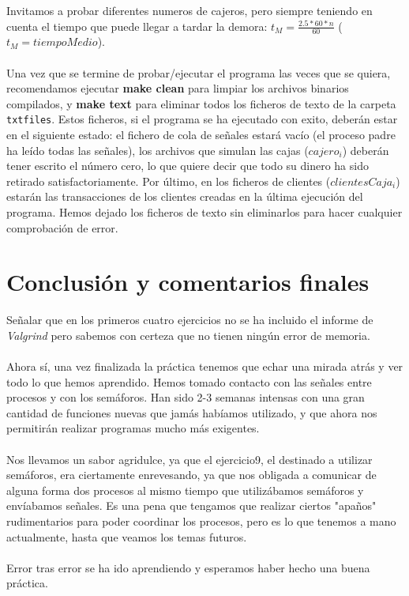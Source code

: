 \documentclass[12pt]{article}
\begin{document}
Invitamos a probar diferentes numeros de cajeros, pero siempre teniendo en cuenta el tiempo que puede llegar a tardar la demora: $t_{M} = \frac{2.5*60*n}{60}$ ($t_{M} = tiempoMedio$).\\\\
Una vez que se termine de probar/ejecutar el programa las veces que se quiera, recomendamos ejecutar \textbf{make clean} para limpiar los archivos binarios compilados, y \textbf{make text} para eliminar todos los ficheros de texto de la carpeta \texttt{txtfiles}. Estos ficheros, si el programa se ha ejecutado con exito, deberán estar en el siguiente estado: el fichero de cola de señales estará vacío (el proceso padre ha leído todas las señales), los archivos que simulan las cajas ($cajero_i$) deberán tener escrito el número cero, lo que quiere decir que todo su dinero ha sido retirado satisfactoriamente. Por último, en los ficheros de clientes ($clientesCaja_i$) estarán las transacciones de los clientes creadas en la última ejecución del programa. Hemos dejado los ficheros de texto sin eliminarlos para hacer cualquier comprobación de error.

\section{Conclusión y comentarios finales}
Señalar que en los primeros cuatro ejercicios no se ha incluido el informe de \emph{Valgrind} pero sabemos con certeza que no tienen ningún error de memoria.\\\\
Ahora sí, una vez finalizada la práctica tenemos que echar una mirada atrás y ver todo lo que hemos aprendido. Hemos tomado contacto con las señales entre procesos y con los semáforos. Han sido 2-3 semanas intensas con una gran cantidad de funciones nuevas que jamás habíamos utilizado, y que ahora nos permitirán realizar programas mucho más exigentes.\\\\
Nos llevamos un sabor agridulce, ya que el ejercicio9, el destinado a utilizar semáforos, era ciertamente enrevesando, ya que nos obligada a comunicar de alguna forma dos procesos al mismo tiempo que utilizábamos semáforos y envíabamos señales. Es una pena que tengamos que realizar ciertos "apaños" rudimentarios para poder coordinar los procesos, pero es lo que 
tenemos a mano actualmente, hasta que veamos los temas futuros.\\\\
Error tras error se ha ido aprendiendo y esperamos haber hecho una buena práctica.
\end{document}
